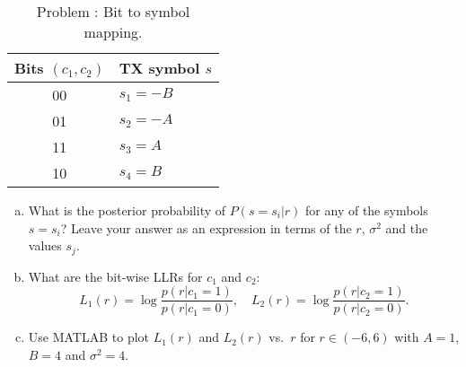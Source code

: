 \documentclass[11pt]{article}
\begin{document}
\begin{enumerate}
\begin{table}
\centering
\begin{tabular}{|c|l|}
  \hline
  Bits $(c_1,c_2)$ & TX symbol $s$ \\ \hline
  00 & $s_1=-B$ \\ \hline
  01 & $s_2=-A$ \\ \hline
  11 & $s_3=A$ \\\hline
  10 & $s_4=B$ \\ \hline
  \hline
\end{tabular}
\caption{Problem \label{prob:bitwisellr}:  Bit to symbol mapping.}
 \label{tbl:bitwisellr}
\end{table}

\begin{enumerate}[(a)]
\item What is the posterior probability of $P(s=s_i|r)$ for any of the symbols $s=s_i$? 
Leave your answer as an expression in terms of the $r$, $\sigma^2$ and the values $s_j$.

\item What are the bit-wise LLRs for $c_1$ and $c_2$:
\[
    L_1(r) = \log \frac{p(r|c_1=1)}{p(r|c_1=0)}, \quad
    L_2(r) = \log \frac{p(r|c_2=1)}{p(r|c_2=0)}.
\]

\item Use MATLAB to plot $L_1(r)$ and $L_2(r)$ vs.\ $r$ for $r \in (-6,6)$ with $A=1$, $B=4$ and $\sigma^2=4$.

\end{enumerate}



\end{enumerate}
\end{document}
